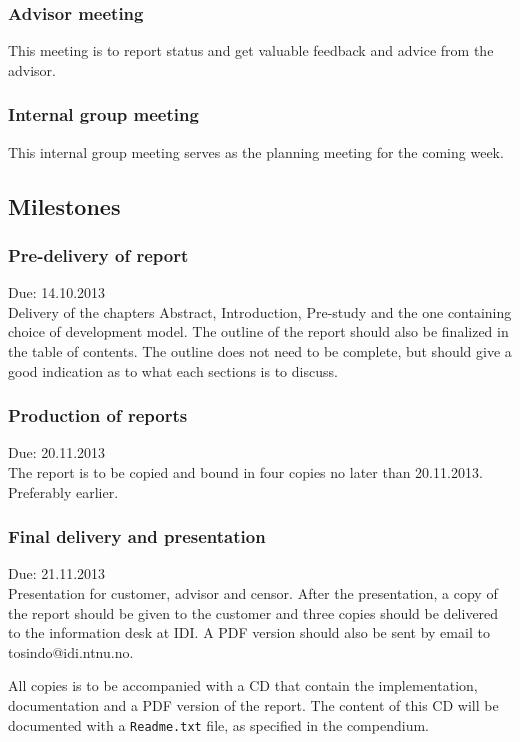 \documentclass[11pt]{book}
\begin{document}
\subsubsection{Advisor meeting}
This meeting is to report status and get valuable feedback and advice from the advisor.

\subsubsection{Internal group meeting}
This internal group meeting serves as the planning meeting for the coming week.

\subsection{Milestones}

\subsubsection{Pre-delivery of report}
Due: 14.10.2013\\
Delivery of the chapters Abstract, Introduction, Pre-study and the one containing choice of development model. The outline of the report should also be finalized in the table of contents. The outline does not need to be complete, but should give a good indication as to what each sections is to discuss.

\subsubsection{Production of reports}
Due: 20.11.2013\\
The report is to be copied and bound in four copies no later than 20.11.2013. Preferably earlier.

\subsubsection{Final delivery and presentation}
Due: 21.11.2013\\
Presentation for customer, advisor and censor. After the presentation, a copy of the report should be given to the customer and three copies should be delivered to the information desk at IDI. A PDF version should also be sent by email to tosindo@idi.ntnu.no.

All copies is to be accompanied with a CD that contain the implementation, documentation and a PDF version of the report. The content of this CD will be documented with a \texttt{Readme.txt} file, as specified in the compendium.
\end{document}
